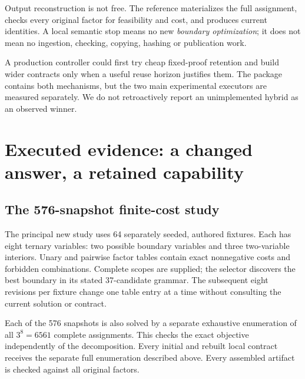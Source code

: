 \documentclass[11pt,letterpaper]{article}
\theoremstyle{definition}\newtheorem{definition}[theorem]{Definition}
\theoremstyle{remark}\newtheorem{remark}[theorem]{Remark}
\begin{document}
Output reconstruction is not free. The reference materializes the full assignment, checks every original factor for feasibility and cost, and produces current identities. A local semantic stop means no new \emph{boundary optimization}; it does not mean no ingestion, checking, copying, hashing or publication work.

A production controller could first try cheap fixed-proof retention and build wider contracts only when a useful reuse horizon justifies them. The package contains both mechanisms, but the two main experimental executors are measured separately. We do not retroactively report an unimplemented hybrid as an observed winner.

\section{Executed evidence: a changed answer, a retained capability}
\label{sec:results}
\subsection{The 576-snapshot finite-cost study}
The principal new study uses 64 separately seeded, authored fixtures. Each has eight ternary variables: two possible boundary variables and three two-variable interiors. Unary and pairwise factor tables contain exact nonnegative costs and forbidden combinations. Complete scopes are supplied; the selector discovers the best boundary in its stated 37-candidate grammar. The subsequent eight revisions per fixture change one table entry at a time without consulting the current solution or contract.

Each of the 576 snapshots is also solved by a separate exhaustive enumeration of all $3^8=6561$ complete assignments. This checks the exact objective independently of the decomposition. Every initial and rebuilt local contract receives the separate full enumeration described above. Every assembled artifact is checked against all original factors.
\end{document}
